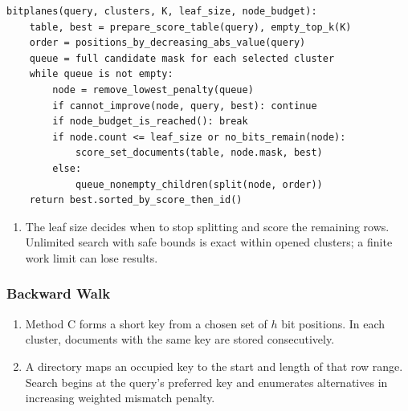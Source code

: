 \begin{lstlisting}
bitplanes(query, clusters, K, leaf_size, node_budget):
    table, best = prepare_score_table(query), empty_top_k(K)
    order = positions_by_decreasing_abs_value(query)
    queue = full candidate mask for each selected cluster
    while queue is not empty:
        node = remove_lowest_penalty(queue)
        if cannot_improve(node, query, best): continue
        if node_budget_is_reached(): break
        if node.count <= leaf_size or no_bits_remain(node):
            score_set_documents(table, node.mask, best)
        else:
            queue_nonempty_children(split(node, order))
    return best.sorted_by_score_then_id()
\end{lstlisting}
\begin{enumerate}[start=7]
\item The leaf size decides when to stop splitting and score the remaining rows. Unlimited search with safe bounds is exact within opened clusters; a finite work limit can lose results.
\end{enumerate}

\newpage
\subsubsection{Backward Walk}
\begin{enumerate}
\item Method C forms a short key from a chosen set of $h$ bit positions. In each cluster, documents with the same key are stored consecutively.
\item A directory maps an occupied key to the start and length of that row range. Search begins at the query's preferred key and enumerates alternatives in increasing weighted mismatch penalty.
\end{enumerate}

